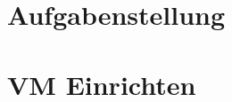 \documentclass[12pt]{article}
\begin{document}
	\begin{titlepage}
		
	\end{titlepage}
	
	\tableofcontents
	\newpage
	
	\section{Aufgabenstellung}
	

	\section{VM Einrichten}
	
	
\end{document}
